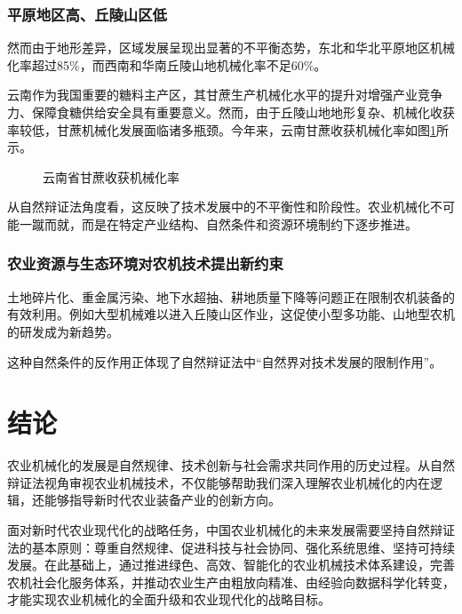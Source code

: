 \documentclass[12pt,fontset=windows,titlepage]{ctexart}
\begin{document}
	\subsubsection{平原地区高、丘陵山区低}

	然而由于地形差异，区域发展呈现出显著的不平衡态势，东北和华北平原地区机械化率超过85\%，而西南和华南丘陵山地机械化率不足60\%\autocite{ZhouBiHuiXianDaiHuaNongYeJiJieZhuTuiNongCunJingJiFaZhanDeLuJingYiGuiLinShiLinGuiQuWeiLi2025}。

	云南作为我国重要的糖料主产区，其甘蔗生产机械化水平的提升对增强产业竞争力、保障食糖供给安全具有重要意义。然而，由于丘陵山地地形复杂、机械化收获率较低，甘蔗机械化发展面临诸多瓶颈。今年来，云南甘蔗收获机械化率如图\ref{graph:云南省甘蔗收获机械化率}所示。

	\begin{figure}[H]
		\centering
		\caption{云南省甘蔗收获机械化率}
		\label{graph:云南省甘蔗收获机械化率}
	\end{figure}

	从自然辩证法角度看，这反映了技术发展中的不平衡性和阶段性。农业机械化不可能一蹴而就，而是在特定产业结构、自然条件和资源环境制约下逐步推进。

	\subsubsection{农业资源与生态环境对农机技术提出新约束}

	土地碎片化、重金属污染、地下水超抽、耕地质量下降等问题正在限制农机装备的有效利用。例如大型机械难以进入丘陵山区作业，这促使小型多功能、山地型农机的研发成为新趋势。
	
	这种自然条件的反作用正体现了自然辩证法中“自然界对技术发展的限制作用”。

	\section{结论}

	农业机械化的发展是自然规律、技术创新与社会需求共同作用的历史过程。从自然辩证法视角审视农业机械技术，不仅能够帮助我们深入理解农业机械化的内在逻辑，还能够指导新时代农业装备产业的创新方向。

	面对新时代农业现代化的战略任务，中国农业机械化的未来发展需要坚持自然辩证法的基本原则：尊重自然规律、促进科技与社会协同、强化系统思维、坚持可持续发展。在此基础上，通过推进绿色、高效、智能化的农业机械技术体系建设，完善农机社会化服务体系，并推动农业生产由粗放向精准、由经验向数据科学化转变，才能实现农业机械化的全面升级和农业现代化的战略目标。

	\printbibliography
\end{document}

